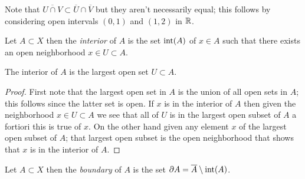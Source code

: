 Note that $\overline{U \cap V} \subset \overline{U} \cap \overline{V}$ but they aren't necessarily equal; this follows by considering open intervals $(0,1)$ and $(1,2)$ in $\mathbb{R}$.

\begin{defn}Let $A \subset X$ then the \emph{interior} of $A$ is the set $\operatorname*{int}(A)$ of
  $x \in A$ such that there exists an open neighborhood $x \in U \subset A$.
\end{defn}

\begin{prop}The interior of $A$ is the largest open set $U \subset A$.
\end{prop}
\begin{proof}
First note that the largest open set in $A$ is the union of all open sets in $A$; this follows since
the latter set is open.  If $x$ is in the interior of $A$ then given the neighborhood $x \in U \subset A$ 
we see that all of $U$ is in the largest open subset of $A$ a fortiori this is true of $x$.  On the other hand given 
any element $x$ of the largest open subset of $A$; that largest open subset is the open neighborhood that shows 
that $x$ is in the interior of $A$.
\end{proof}

\begin{defn}Let $A \subset X$ then the \emph{boundary} of $A$ is the set $\partial A = \overline{A} \setminus \operatorname*{int}(A)$.
\end{defn}

